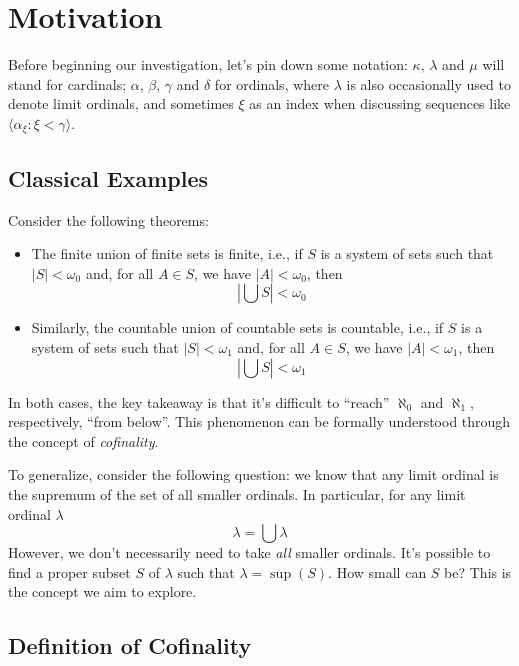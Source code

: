 \chapter{Motivation}

Before beginning our investigation, let's pin down some notation: $\kappa$, $\lambda$ and $\mu$ will stand for cardinals; $\alpha$, $\beta$, $\gamma$ and $\delta$ for ordinals, where $\lambda$ is also occasionally used to denote limit ordinals, and sometimes $\xi$ as an index when discussing sequences like $\langle\alpha_\xi:\xi<\gamma\rangle$.

\section{Classical Examples}

Consider the following theorems:

\begin{tcolorbox}[colback=gray!5,colframe=gray!80!black]
    \begin{itemize}
    \item The finite union of finite sets is finite, i.e., if $S$ is a system of sets such that $|S|<\omega_0$ and, for all $A\in S$, we have $|A|<\omega_0$, then
    $$\left|\bigcup S\right|<\omega_0$$
    \item Similarly, the countable union of countable sets is countable, i.e., if $S$ is a system of sets such that $|S|<\omega_1$ and, for all $A\in S$, we have $|A|<\omega_1$, then
    $$\left|\bigcup S\right|<\omega_1$$
    \end{itemize}
\end{tcolorbox}

In both cases, the key takeaway is that it’s difficult to ``reach'' $\aleph_0$ and $\aleph_1$, respectively, ``from below''. This phenomenon can be formally understood through the concept of \textit{cofinality}.

To generalize, consider the following question: we know that any limit ordinal is the supremum of the set of all smaller ordinals. In particular, for any limit ordinal $\lambda$
$$\lambda=\bigcup\lambda$$
However, we don’t necessarily need to take \textit{all} smaller ordinals. It’s possible to find a proper subset $S$ of $\lambda$ such that $\lambda=\sup(S)$. How small can $S$ be? This is the concept we aim to explore.

\section{Definition of Cofinality}

